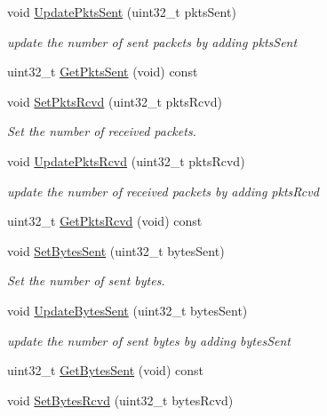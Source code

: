 \begin{DoxyCompactItemize}
void \hyperlink{classns3_1_1ServiceFlowRecord_a1f578adfc99f8841c3983675faf3e879}{Update\+Pkts\+Sent} (uint32\+\_\+t pkts\+Sent)
\begin{DoxyCompactList}\small\item\em update the number of sent packets by adding pkts\+Sent \end{DoxyCompactList}\item 
uint32\+\_\+t \hyperlink{classns3_1_1ServiceFlowRecord_a7df0ac6d2909fe0cbc631ef1e7765e00}{Get\+Pkts\+Sent} (void) const 
\item 
void \hyperlink{classns3_1_1ServiceFlowRecord_a2c6354d833a33fec2ad93090039862e6}{Set\+Pkts\+Rcvd} (uint32\+\_\+t pkts\+Rcvd)
\begin{DoxyCompactList}\small\item\em Set the number of received packets. \end{DoxyCompactList}\item 
void \hyperlink{classns3_1_1ServiceFlowRecord_ab0ab1bc25dae670cb59799f604447860}{Update\+Pkts\+Rcvd} (uint32\+\_\+t pkts\+Rcvd)
\begin{DoxyCompactList}\small\item\em update the number of received packets by adding pkts\+Rcvd \end{DoxyCompactList}\item 
uint32\+\_\+t \hyperlink{classns3_1_1ServiceFlowRecord_a531630dbfbf8d32d8385a879916f0915}{Get\+Pkts\+Rcvd} (void) const 
\item 
void \hyperlink{classns3_1_1ServiceFlowRecord_acd1293b90e58cd810464ea318ec6c3bb}{Set\+Bytes\+Sent} (uint32\+\_\+t bytes\+Sent)
\begin{DoxyCompactList}\small\item\em Set the number of sent bytes. \end{DoxyCompactList}\item 
void \hyperlink{classns3_1_1ServiceFlowRecord_a3c0ec7f82731867f913b466441a9887e}{Update\+Bytes\+Sent} (uint32\+\_\+t bytes\+Sent)
\begin{DoxyCompactList}\small\item\em update the number of sent bytes by adding bytes\+Sent \end{DoxyCompactList}\item 
uint32\+\_\+t \hyperlink{classns3_1_1ServiceFlowRecord_a28271a95ad2bbead49edc7455140df9d}{Get\+Bytes\+Sent} (void) const 
\item 
void \hyperlink{classns3_1_1ServiceFlowRecord_abf9535d5c19397cc6d9eaea4df2ddfba}{Set\+Bytes\+Rcvd} (uint32\+\_\+t bytes\+Rcvd)

\end{DoxyCompactItemize}
